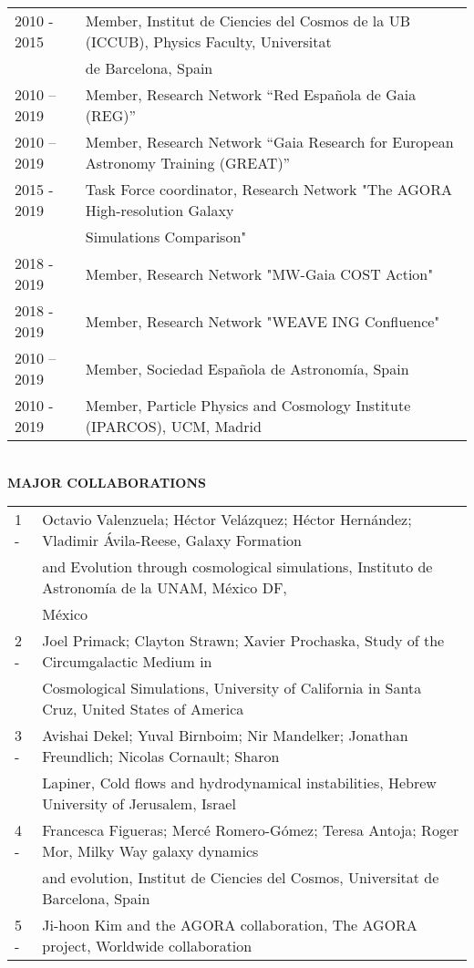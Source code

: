 \documentclass[oneside, a4paper, onecolumn, 11pt]{article}
\begin{document}
{\begin{tabular}{ll}
2010 - 2015 & Member, Institut de Ciencies del Cosmos de la UB (ICCUB), Physics Faculty, Universitat \\
 & de Barcelona, Spain \\
2010 – 2019 &	Member, Research Network “Red Española de Gaia (REG)”  \\
2010 – 2019 &	Member, Research Network “Gaia Research for European Astronomy Training (GREAT)”  \\
2015 - 2019 & Task Force coordinator, Research Network "The AGORA High-resolution Galaxy\\
 &  Simulations Comparison" \\
2018 - 2019 & Member, Research Network "MW-Gaia COST Action" \\
2018 - 2019 & Member, Research Network  "WEAVE ING Confluence" \\
2010 – 2019 & Member, Sociedad Española de Astronomía, Spain \\
2010 - 2019 & Member, Particle Physics and Cosmology Institute (IPARCOS), UCM, Madrid \\
\end{tabular}\\

{\bf MAJOR COLLABORATIONS}\\

\begin{tabular}{ll}
 1 - & Octavio Valenzuela; Héctor Velázquez; Héctor Hernández; Vladimir Ávila-Reese, Galaxy Formation  \\
 & and Evolution through cosmological simulations, Instituto de Astronomía de la UNAM, México DF,\\
 & México \\
2 -  & Joel Primack; Clayton Strawn; Xavier Prochaska, Study of the Circumgalactic Medium in\\
 & Cosmological Simulations, University of California in Santa Cruz, United States of America \\
3 - & Avishai Dekel; Yuval Birnboim; Nir Mandelker; Jonathan Freundlich; Nicolas Cornault; Sharon\\
 & Lapiner, Cold flows and hydrodynamical instabilities, Hebrew University of Jerusalem, Israel \\
4 - & Francesca Figueras; Mercé Romero-Gómez; Teresa Antoja; Roger Mor, Milky Way galaxy dynamics\\
 & and evolution, Institut de Ciencies del Cosmos, Universitat de Barcelona, Spain  \\
5 -  & Ji-hoon Kim and the AGORA collaboration, The AGORA project, Worldwide collaboration \\
\end{tabular}\\

}
\end{document}
